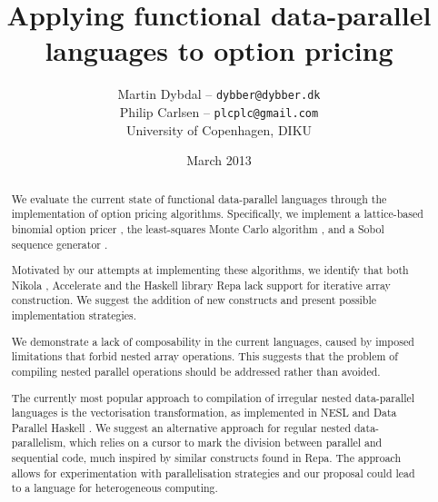 \documentclass[10pt,a4paper,final,oneside,openany]{memoir}
\title{Applying functional data-parallel languages to option pricing}
\author{
  Martin Dybdal -- \texttt{dybber@dybber.dk} \\
  Philip Carlsen -- \texttt{plcplc@gmail.com}
\\
University of Copenhagen, DIKU}
\date{March 2013}
\begin{document}
\frontmatter






 \clearpage
~
\vspace{3cm}
  \begin{abstract}
    We evaluate the current state of functional data-parallel
    languages through the implementation of option pricing
    algorithms. Specifically, we implement a lattice-based binomial
    option pricer \cite{cox1979option}, the least-squares Monte Carlo
    algorithm \cite{longstaff2001valuing}, and a Sobol sequence
    generator \cite{bratley1988algorithm}.

    Motivated by our attempts at implementing these algorithms, we
    identify that both Nikola \cite{mainland2010nikola}, Accelerate
    \cite{chakravarty2011accelerating} and the Haskell library Repa
    \cite{keller2010regular} lack support for iterative array
    construction. We suggest the addition of new constructs and
    present possible implementation strategies.

    We demonstrate a lack of composability in the current languages,
    caused by imposed limitations that forbid nested array
    operations. This suggests that the problem of compiling nested
    parallel operations should be addressed rather than avoided.

    The currently most popular approach to compilation of irregular
    nested data-parallel languages is the vectorisation
    transformation, as implemented in NESL \cite{nesl} and Data
    Parallel Haskell \cite{spj2008dph}.  We
    suggest an alternative approach for regular nested
    data-parallelism, which relies on a cursor to mark the division
    between parallel and sequential code, much inspired by similar
    constructs found in Repa. The approach allows for experimentation
    with parallelisation strategies and our proposal could lead to a
    language for heterogeneous computing.
  \end{abstract}
\end{document}
